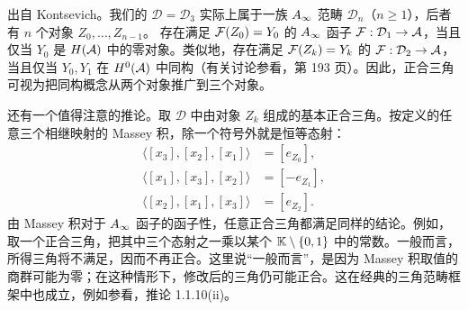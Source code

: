 \begin{note}\label{st:3.11}
出自 Kontsevich。我们的 $\mathcal D=\mathcal D_3$ 实际上属于一族 $A_\infty$ 范畴 $\mathcal D_n$（$n\geq1$），后者有 $n$ 个对象 $Z_0,\ldots,Z_{n-1}$。
存在满足 $\mathcal F(Z_0)=Y_0$ 的 $A_\infty$ 函子 $\mathcal F:\mathcal D_1\to\mathcal A$，当且仅当 $Y_0$ 是 $H(\mathcal A)$ 中的零对象。类似地，存在满足 $\mathcal F(Z_k)=Y_k$ 的 $\mathcal F:\mathcal D_2\to\mathcal A$，当且仅当 $Y_0,Y_1$ 在 $H^0(\mathcal A)$ 中同构（有关讨论参看，第 193 页）。因此，正合三角可视为把同构概念从两个对象推广到三个对象。
\end{note}

\begin{note}\label{st:3.12}
还有一个值得注意的推论。取 $\mathcal D$ 中由对象 $Z_k$ 组成的基本正合三角。按定义的任意三个相继映射的 Massey 积，除一个符号外就是恒等态射：
\begin{equation}\label{eq:3.13}
\begin{aligned}
\langle[x_3],[x_2],[x_1]\rangle&=[e_{Z_0}],\\
\langle[x_1],[x_3],[x_2]\rangle&=[-e_{Z_1}],\\
\langle[x_2],[x_1],[x_3]\rangle&=[e_{Z_2}].
\end{aligned}
\end{equation}
由 Massey 积对于 $A_\infty$ 函子的函子性，任意正合三角都满足同样的结论。例如，取一个正合三角，把其中三个态射之一乘以某个 $\mathbb K\setminus\{0,1\}$ 中的常数。一般而言，所得三角将不满足，因而不再正合。这里说“一般而言”，是因为 Massey 积取值的商群可能为零；在这种情形下，修改后的三角仍可能正合。这在经典的三角范畴框架中也成立，例如参看，推论 1.1.10(ii)。
\end{note}

